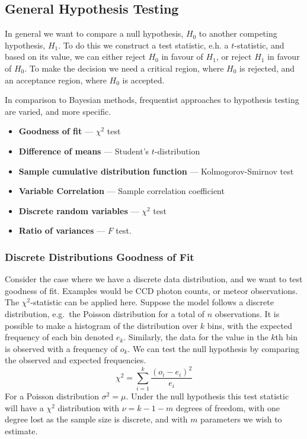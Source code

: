 \documentclass{dwnotes}         		        %
\begin{document}
\subsection{General Hypothesis Testing}
\label{sec:gener-hypoth-test}

In general we want to compare a null hypothesis, $H_0$ to another
competing hypothesis, $H_1$. To do this we construct a test statistic,
e.h. a $t$-statistic, and based on its value, we can either reject
$H_0$ in favour of $H_1$, or reject $H_1$ in favour of $H_0$. To make
the decision we need a critical region, where $H_0$ is rejected, and
an acceptance region, where $H_0$ is accepted.

In comparison to Bayesian methods, frequentist approaches to
hypothesis testing are varied, and more specific.

\begin{itemize}
\item {\bf Goodness of fit} --- $\chi^2$ test
\item {\bf Difference of means} --- Student's $t$-distribution
\item {\bf Sample cumulative distribution function} --- Kolmogorov-Smirnov test
\item {\bf Variable Correlation} --- Sample correlation coefficient
\item {\bf Discrete random variables} --- $\chi^2$ test
\item {\bf Ratio of variances} --- $F$ test.
\end{itemize}

\subsubsection{Discrete Distributions Goodness of Fit}
\label{sec:discr-distr-goodn}

Consider the case where we have a discrete data distribution, and we
want to test goodness of fit. Examples would be CCD photon counts, or
meteor observations. The $\chi^2$-statistic can be applied
here. Suppose the model follows a discrete distribution, e.g.\ the
Poisson distribution for a total of $n$ observations. It is possible
to make a histogram of the distribution over $k$ bins, with the
expected frequency of each bin denoted $e_k$. Similarly, the data for
the value in the $k$th bin is observed with a frequency of $o_k$. We
can test the null hypothesis by comparing the observed and expected
frequencies.
\[\chi^2 = \sum_{i=1}^k \frac{(o_i - e_i)^2}{e_i} \]
For a Poisson distribution $\sigma^2 = \mu$. Under the null hypothesis
this test statistic will have a $\chi^2$ distribution with $\nu=k-1-m$
degrees of freedom, with one degree lost as the sample size is
discrete, and with $m$ parameters we wish to estimate.
\end{document}
